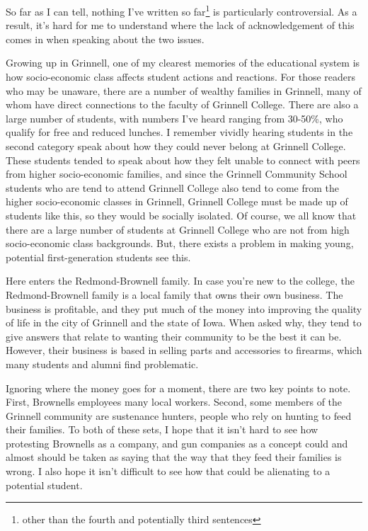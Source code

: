 \documentclass[12pt]{article}[titlepage]
\newcommand{\1}{\={a}}
\newcommand{\2}{\={e}}
\newcommand{\3}{\={\i}}
\newcommand{\4}{\=o}
\newcommand{\5}{\=u}
\newcommand{\6}{\={A}}
\renewcommand{\,}{\textsuperscript{,}}
\begin{document}
So far as I can tell, nothing I've written so far\footnote{other than the fourth and potentially third sentences} is particularly controversial.
As a result, it's hard for me to understand where the lack of acknowledgement of this comes in when speaking about the two issues.

Growing up in Grinnell, one of my clearest memories of the educational system is how socio-economic class affects student actions and reactions.
For those readers who may be unaware, there are a number of wealthy families in Grinnell, many of whom have direct connections to the faculty of Grinnell College.
There are also a large number of students, with numbers I've heard ranging from 30-50\%, who qualify for free and reduced lunches.
I remember vividly hearing students in the second category speak about how they could never belong at Grinnell College.
These students tended to speak about how they felt unable to connect with peers from higher socio-economic families, and since the Grinnell Community School students who are tend to attend Grinnell College also tend to come from the higher socio-economic classes in Grinnell, Grinnell College must be made up of students like this, so they would be socially isolated.
Of course, we all know that there are a large number of students at Grinnell College who are not from high socio-economic class backgrounds.
But, there exists a problem in making young, potential first-generation students see this.

Here enters the Redmond-Brownell family.
In case you're new to the college, the Redmond-Brownell family is a local family that owns their own business.
The business is profitable, and they put much of the money into improving the quality of life in the city of Grinnell and the state of Iowa.
When asked why, they tend to give answers that relate to wanting their community to be the best it can be.
However, their business is based in selling parts and accessories to firearms, which many students and alumni find problematic.

Ignoring where the money goes for a moment, there are two key points to note.
First, Brownells employees many local workers.
Second, some members of the Grinnell community are sustenance hunters, people who rely on hunting to feed their families.
To both of these sets, I hope that it isn't hard to see how protesting Brownells as a company, and gun companies as a concept could and almost should be taken as saying that the way that they feed their families is wrong.
I also hope it isn't difficult to see how that could be alienating to a potential student.
\end{document}
